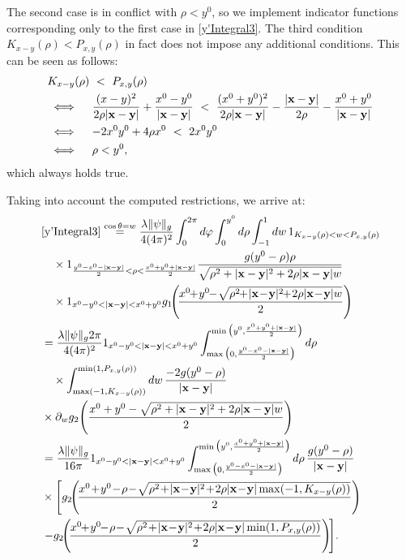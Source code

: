 \documentclass[b5paper,draft,openbib,12pt]{memoir}
\newcommand{\vx}{\mathbf{x}}
\newcommand{\vy}{\mathbf{y}}
\begin{document}
The second case is in conflict with \(\rho<y^0\), so 
we implement indicator functions corresponding only to 
the first case in \eqref{y'Integral3}. The third 
condition \(K_{x-y}(\rho)<P_{x,y}(\rho)\) in fact does 
not impose any additional conditions. This can be seen 
as follows:
\begin{align}\notag
  &K_{x-y}(\rho)~<~P_{x,y}(\rho)\\
  &\iff~~~ \frac{(x-y)^2}{2\rho|\vx-\vy|}+\frac{x^0-y^0}{|\vx-\vy|}~<~\frac{(x^0+y^0)^2}{2\rho|\vx-\vy|} - \frac{|\vx-\vy|}{2\rho}-\frac{x^0+y^0}{|\vx-\vy|}\nonumber\\
  &\iff~~~ -2x^0y^0 + 4\rho x^0~<~2x^0y^0\nonumber\\
  &\iff~~~   \rho<y^0,
\end{align}
which always holds true.

Taking into account the computed restrictions, we 
arrive at:
\begin{align}
    &\eqref{y'Integral3} \stackrel{\cos\theta=w}{=}\frac{\lambda \|\psi\|_g}{4(4\pi)^2} \int_0^{2\pi} d\varphi \int_0^{y^0} d\rho \int_{-1}^1 dw \,1_{K_{x-y}(\rho)<w<P_{x,y}(\rho)}  \nonumber\\
     &\quad \times 1_{\frac{y^0-x^0-|\vx-\vy|}{2}<\rho<\frac{x^0+y^0+|\vx-\vy|}{2}}\frac{g(y^0-\rho)\rho}{\sqrt{\rho^2+|\vx-\vy|^2+2\rho|\vx-\vy|w}} \nonumber\\
     &\quad \times 1_{x^0-y^0<|\vx-\vy|<x^0+y^0} g_1\!\!\left( \!\frac{x^0\!\!+\!y^0\!\!-\!\sqrt{\rho^2\!\!+\!|\vx\!-\!\vy|^2\!\!+\!2\rho|\vx\!-\!\vy|w}}{2}\right)\nonumber\\
     &= \frac{\lambda \|\psi\|_g 2\pi}{4(4\pi)^2}1_{x^0-y^0<|\vx-\vy|<x^0+y^0} \int_{\max\big(0,\frac{y^0-x^0-|\vx-\vy|}{2}\big)}^{\min\big(y^0,\frac{x^0+y^0+|\vx-\vy|}{2} \big)}d\rho\notag\\
     &\quad \times \int_{\max(-1,K_{x-y}(\rho))}^{\min(1,P_{x,y}(\rho))}dw \, \frac{-2 g(y^0-\rho)}{|\vx-\vy|}\nonumber\\
     &\times \partial_w 
     g_2\!\left(\frac{x^0+y^0-\sqrt{\rho^2+|\vx-\vy|^2 +2\rho|\vx-\vy|w}}{2} \right)\nonumber\\
     &=\frac{\lambda \|\psi\|_g}{16\pi} 1_{x^0-y^0<|\vx-\vy|<x^0+y^0} 
     \int_{\max\big(0,\frac{y^0-x^0-|\vx-\vy|}{2}\big)}^{\min\big(y^0,\frac{x^0+y^0+|\vx-\vy|}{2} \big)}d\rho \, \frac{g(y^0-\rho)}{|\vx-\vy|}\nonumber\\ 
     &\times \left[g_2\!\!\left(\!\frac{x^0\!+\!y^0\!-\!\rho\!-\!\sqrt{\rho^2\!+\!|\vx\!-\!\vy|^2\!+\!2\rho|\vx\!-\!\vy|\max(-1,K_{x-y}(\rho))}}{2}\right)\right.\nonumber\\
     &\left.-g_2\!\!\left(\!\frac{x^0\!\!+\!y^0\!\!-\!\rho\!-\!\sqrt{\rho^2\!+\!|\vx\!-\!\vy|^2\!+\!2\rho|\vx\!-\!\vy|\min(1,P_{x,y}(\rho))}}{2}\right)
     \!\right]\!.
\end{align}
\end{document}
